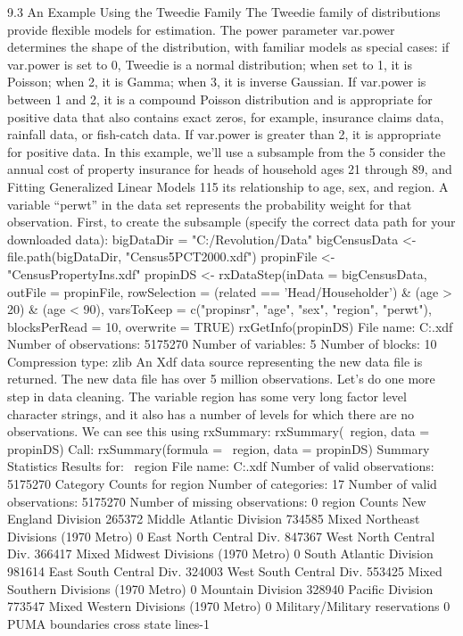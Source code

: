 9.3 An Example Using the Tweedie Family
The Tweedie family of distributions provide flexible models for estimation. The power
parameter var.power determines the shape of the distribution, with familiar models as special
cases: if var.power is set to 0, Tweedie is a normal distribution; when set to 1, it is Poisson;
when 2, it is Gamma; when 3, it is inverse Gaussian. If var.power is between 1 and 2, it is a
compound Poisson distribution and is appropriate for positive data that also contains exact
zeros, for example, insurance claims data, rainfall data, or fish-catch data. If var.power is
greater than 2, it is appropriate for positive data.
In this example, we’ll use a subsample from the 5%
consider the annual cost of property insurance for heads of household ages 21 through 89, and 
Fitting Generalized Linear Models 115
its relationship to age, sex, and region. A variable “perwt” in the data set represents the
probability weight for that observation. First, to create the subsample (specify the correct data
path for your downloaded data):
bigDataDir = "C:/Revolution/Data"
bigCensusData <- file.path(bigDataDir, "Census5PCT2000.xdf")
propinFile <- "CensusPropertyIns.xdf"
propinDS <- rxDataStep(inData = bigCensusData, outFile = propinFile,
 rowSelection = (related == 'Head/Householder') & (age > 20) & (age < 90),
 varsToKeep = c("propinsr", "age", "sex", "region", "perwt"),
 blocksPerRead = 10, overwrite = TRUE)
rxGetInfo(propinDS)
File name: C:\YourWorkingDir\CensusPropertyIns.xdf
Number of observations: 5175270
Number of variables: 5
Number of blocks: 10
Compression type: zlib
An Xdf data source representing the new data file is returned. The new data file has over 5
million observations.
Let’s do one more step in data cleaning. The variable region has some very long factor level
character strings, and it also has a number of levels for which there are no observations. We
can see this using rxSummary:
rxSummary(~region, data = propinDS)
Call:
rxSummary(formula = ~region, data = propinDS)
Summary Statistics Results for: ~region
File name: C:\YourWorkingDir\CensusPropertyIns.xdf
Number of valid observations: 5175270
Category Counts for region
Number of categories: 17
Number of valid observations: 5175270
Number of missing observations: 0
region Counts
New England Division 265372
Middle Atlantic Division 734585
Mixed Northeast Divisions (1970 Metro) 0
East North Central Div. 847367
West North Central Div. 366417
Mixed Midwest Divisions (1970 Metro) 0
South Atlantic Division 981614
East South Central Div. 324003
West South Central Div. 553425
Mixed Southern Divisions (1970 Metro) 0
Mountain Division 328940
Pacific Division 773547
Mixed Western Divisions (1970 Metro) 0
Military/Military reservations 0
PUMA boundaries cross state lines-1%
